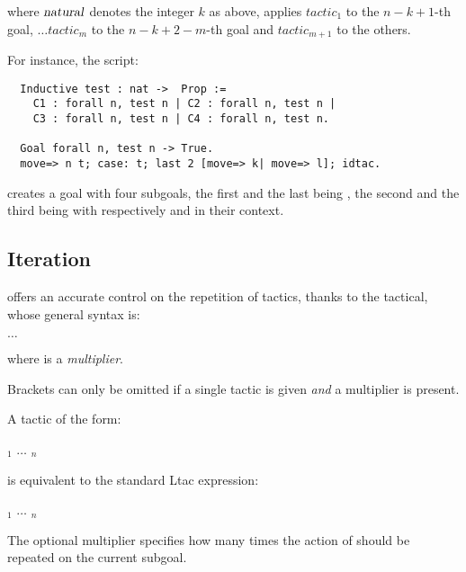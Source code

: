 where ${\textrm{\textsl{natural}}}$ denotes the integer $k$ as above, applies $tactic_1$ to the
$n -k + 1$-th goal, $\dots tactic_m$ to the $n -k + 2 - m$-th
goal and $tactic_{m+1}$ to the others.

For instance, the script:
\begin{lstlisting}
  Inductive test : nat ->  Prop :=
    C1 : forall n, test n | C2 : forall n, test n |
    C3 : forall n, test n | C4 : forall n, test n.

  Goal forall n, test n -> True.
  move=> n t; case: t; last 2 [move=> k| move=> l]; idtac.
\end{lstlisting}

creates a goal with four subgoals, the first and the last being
, the second and the third being  with
respectively  and  in their context.

\subsection{Iteration}\label{ssec:iter}

\ssr{} offers an accurate control on the repetition of
tactics, thanks to the  tactical, whose general syntax is:

\begin{center}
          \ssrC{[}  \ssrC{|} $\dots$ \ssrC{|}  \ssrC{]}
\end{center}
where  is a \emph{multiplier}.

Brackets can only be omitted if a single tactic is given \emph{and} a
multiplier is present.

A tactic of the form:

\begin{center}
  \ssrC{do [} \tac$_1$ \ssrC{|} $\dots$ \ssrC{|} \tac$_n$\ssrC{].}
\end{center}

is equivalent to the standard Ltac expression:

\begin{center}
  \ssrC{first [} \tac$_1$ \ssrC{|} $\dots$ \ssrC{|} \tac$_n$\ssrC{].}
\end{center}


The optional multiplier  specifies how many times
the action of {\tac} should be repeated on the current subgoal.

